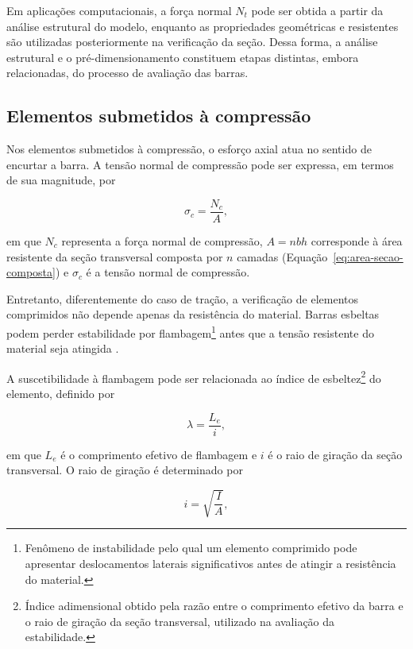 Em aplicações computacionais, a força normal \(N_t\) pode ser obtida a partir da análise estrutural do modelo, enquanto as propriedades geométricas e resistentes são utilizadas posteriormente na verificação da seção. Dessa forma, a análise estrutural e o pré-dimensionamento constituem etapas distintas, embora relacionadas, do processo de avaliação das barras.

\subsection{Elementos submetidos à compressão}
\label{subsec:compressao}

Nos elementos submetidos à compressão, o esforço axial atua no sentido de encurtar a barra. A tensão normal de compressão pode ser expressa, em termos de sua magnitude, por

\begin{equation}
\sigma_c = \frac{N_c}{A},
\end{equation}

em que \(N_c\) representa a força normal de compressão, \(A = nbh\) corresponde à área resistente da seção transversal composta por \(n\) camadas (Equação~\ref{eq:area-secao-composta}) e \(\sigma_c\) é a tensão normal de compressão.

Entretanto, diferentemente do caso de tração, a verificação de elementos comprimidos não depende apenas da resistência do material. Barras esbeltas podem perder estabilidade por flambagem\footnote{Fenômeno de instabilidade pelo qual um elemento comprimido pode apresentar deslocamentos laterais significativos antes de atingir a resistência do material.} antes que a tensão resistente do material seja atingida \cite{souza2015flambagem,silva2026ruptura}.

A suscetibilidade à flambagem pode ser relacionada ao índice de esbeltez\footnote{Índice adimensional obtido pela razão entre o comprimento efetivo da barra e o raio de giração da seção transversal, utilizado na avaliação da estabilidade.} do elemento, definido por

\begin{equation}
\lambda = \frac{L_e}{i},
\end{equation}

em que \(L_e\) é o comprimento efetivo de flambagem e \(i\) é o raio de giração da seção transversal. O raio de giração é determinado por

\begin{equation}
i = \sqrt{\frac{I}{A}},
\end{equation}

